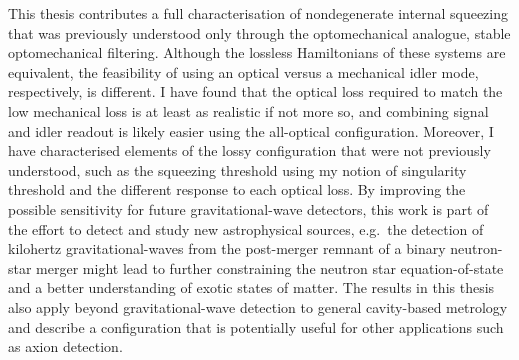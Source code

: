 This thesis contributes a full  characterisation of nondegenerate internal squeezing that was previously understood only through the optomechanical analogue, stable optomechanical filtering. Although the lossless Hamiltonians of these systems are equivalent, the feasibility of using an optical versus a mechanical idler mode, respectively, is different. I have found that the optical loss required to match the low mechanical loss is at least as realistic if not more so, and combining signal and idler readout is likely easier using the all-optical configuration. Moreover, I have characterised elements of the lossy configuration that were not previously understood, such as the squeezing threshold using my notion of singularity threshold and the different response to each optical loss.
By improving the possible sensitivity for future gravitational-wave detectors, this work is part of the effort to detect and study new astrophysical sources, e.g.\ the detection of kilohertz gravitational-waves from the post-merger remnant of a binary neutron-star merger might lead to further constraining the neutron star equation-of-state and a better understanding of exotic states of matter.
The results in this thesis also apply beyond gravitational-wave detection to general cavity-based metrology and describe a configuration that is potentially useful for other applications such as axion detection.




